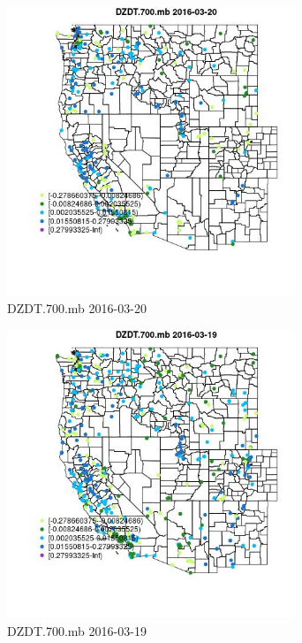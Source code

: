\begin{figure} 
\centering  
\includegraphics[width=0.77\textwidth]{Code_Outputs/Report_ML_input_PM25_Step4_part_e_de_duplicated_aveswNAs_MapObsDZDT700mb2016-03-20.jpg} 
\caption{\label{fig:Report_ML_input_PM25_Step4_part_e_de_duplicated_aveswNAsMapObsDZDT700mb2016-03-20}DZDT.700.mb 2016-03-20} 
\end{figure} 
 

\begin{figure} 
\centering  
\includegraphics[width=0.77\textwidth]{Code_Outputs/Report_ML_input_PM25_Step4_part_e_de_duplicated_aveswNAs_MapObsDZDT700mb2016-03-19.jpg} 
\caption{\label{fig:Report_ML_input_PM25_Step4_part_e_de_duplicated_aveswNAsMapObsDZDT700mb2016-03-19}DZDT.700.mb 2016-03-19} 
\end{figure} 
 

